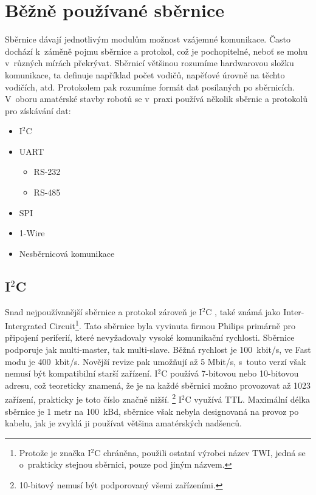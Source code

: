 \chapter{Běžně používané sběrnice}
Sběrnice dávají jednotlivým modulům možnost vzájemné komunikace.
Často dochází k~záměně pojmu sběrnice a protokol, což je pochopitelné, neboť se mohu v~různých mírách překrývat.
Sběrnicí většinou rozumíme hardwarovou složku komunikace, ta definuje například počet vodičů, napěťové úrovně na těchto vodičích, atd.
Protokolem pak rozumíme formát dat posílaných po sběrnicích.
V~oboru amatérské stavby robotů se v~praxi používá několik sběrnic a protokolů pro získávání dat:
\begin{itemize}
	\item I$^{2}$C
	\item UART
	      \begin{itemize}
	      	\item RS-232
	      	\item RS-485
	      \end{itemize}
	\item SPI
	\item 1-Wire
	\item Nesběrnicová komunikace
\end{itemize}

\section{I$^{2}$C}
Snad nejpoužívanější sběrnice a protokol zároveň je I$^{2}$C \cite{nxp:UM10204},
také známá jako Inter-Intergrated Circuit\footnote{ Protože je značka I$^{2}$C chráněna, použili ostatní výrobci název TWI, jedná se o~prakticky stejnou sběrnici, pouze pod jiným názvem.}.
Tato sběrnice byla vyvinuta firmou Philips primárně pro připojení periferií, které nevyžadovaly vysoké komunikační rychlosti.
Sběrnice podporuje jak multi-master, tak multi-slave.
Běžná rychlost je 100~kbit/s, ve Fast modu je 400~kbit/s. Novější revize pak umožňují až 5 Mbit/s, s~touto verzí však nemusí být kompatibilní starší zařízení.
I$^{2}$C používá 7-bitovou nebo 10-bitovou adresu, což teoreticky znamená, že je na každé sběrnici možno provozovat až 1023 zařízení, prakticky je toto číslo značně nižší. \footnote{10-bitový nemusí být podporovaný všemi zařízeními.}
I$^{2}$C využívá TTL.
Maximální délka sběrnice je 1 metr na 100~kBd, sběrnice však nebyla designovaná na provoz po kabelu, jak je zvyklá ji používat většina amatérských nadšenců.

